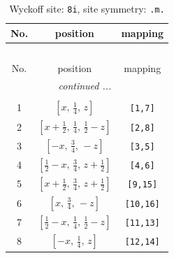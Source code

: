 \documentclass[fleqn,8pt]{jsarticle}
\begin{document}
\begin{longtable}{ccc}
\caption{Wyckoff site: {\tt 8i}, site symmetry: {\tt .m.}}
 \\
 \hline \hline
No. & position & mapping \\ \hline \endfirsthead

\multicolumn{2}{l}{\tablename\ \thetable{}} \\
 \hline \hline
No. & position & mapping \\ \hline \endhead

 \hline \hline
\multicolumn{2}{r}{\footnotesize\it continued ...} \\ \endfoot

 \hline \hline
\multicolumn{2}{r}{} \\ \endlastfoot

1 & $\left[ x,\, \frac{1}{4},\, z \right]$ & {\tt [1,7]} \\ \hline
2 & $\left[ x + \frac{1}{2},\, \frac{1}{4},\, \frac{1}{2} - z \right]$ & {\tt [2,8]} \\ \hline
3 & $\left[ - x,\, \frac{3}{4},\, - z \right]$ & {\tt [3,5]} \\ \hline
4 & $\left[ \frac{1}{2} - x,\, \frac{3}{4},\, z + \frac{1}{2} \right]$ & {\tt [4,6]} \\ \hline
5 & $\left[ x + \frac{1}{2},\, \frac{3}{4},\, z + \frac{1}{2} \right]$ & {\tt [9,15]} \\ \hline
6 & $\left[ x,\, \frac{3}{4},\, - z \right]$ & {\tt [10,16]} \\ \hline
7 & $\left[ \frac{1}{2} - x,\, \frac{1}{4},\, \frac{1}{2} - z \right]$ & {\tt [11,13]} \\ \hline
8 & $\left[ - x,\, \frac{1}{4},\, z \right]$ & {\tt [12,14]} \\
\end{longtable}
\renewcommand{\arraystretch}{1.2}
\end{document}
